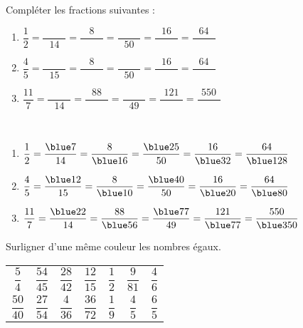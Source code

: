 \begin{colonne*exercice}
\begin{exercice} %
   Compléter les fractions suivantes : \medskip
   \begin{enumerate}
      \item $\dfrac{1}{2} =\dfrac{\qquad\;}{14} =\dfrac{8}{\qquad\;} =\dfrac{\qquad\;}{50} =\dfrac{16}{\qquad\;} =\dfrac{64}{\qquad\;}$ \\ [2mm]
      \item $\dfrac{4}{5} =\dfrac{\qquad\;}{15} =\dfrac{8}{\qquad\;} =\dfrac{\qquad\;}{50} =\dfrac{16}{\qquad\;} =\dfrac{64}{\qquad\;}$ \\ [2mm]
      \item $\dfrac{11}{7} =\dfrac{\qquad\;}{14} =\dfrac{88}{\qquad\;} =\dfrac{\qquad\;}{49} =\dfrac{121}{\qquad\;} =\dfrac{550}{\qquad\;}$ \\
   \end{enumerate}
\end{exercice}

\begin{corrige}
   \ \\ [-5mm]
   \begin{enumerate}
      \item $\dfrac{1}{2} =\dfrac{\blue 7}{14} =\dfrac{8}{\blue 16} =\dfrac{\blue 25}{50} =\dfrac{16}{\blue 32} =\dfrac{64}{\blue 128}$ \\ [2mm]
      \item $\dfrac{4}{5} =\dfrac{\blue 12}{15} =\dfrac{8}{\blue 10} =\dfrac{\blue 40}{50} =\dfrac{16}{\blue 20} =\dfrac{64}{\blue 80}$ \\ [2mm]
      \item $\dfrac{11}{7} =\dfrac{\blue 22}{14} =\dfrac{88}{\blue 56} =\dfrac{\blue 77}{49} =\dfrac{121}{\blue 77} =\dfrac{550}{\blue 350}$
   \end{enumerate}
\end{corrige}

\medskip

\begin{exercice} %
   Surligner d'une même couleur les nombres égaux. \\ [2mm]
   {
   \begin{tabular}{|*{7}{C{0.8}}|}
      \hline
      $\dfrac{5}{4}$ & $\dfrac{54}{45}$ & $\dfrac{28}{42}$ & $\dfrac{12}{15}$ & $\dfrac{1}{2}$ & $\dfrac{9}{81}$ & $\dfrac{4}{6}$ \\ [2mm]
      $\dfrac{50}{40}$ & $\dfrac{27}{54}$ & $\dfrac{4}{36}$ & $\dfrac{36}{72}$ & $\dfrac{1}{9}$ & $\dfrac{4}{5}$ & $\dfrac{6}{5}$ \\ [2mm]
      \hline
   \end{tabular}} \\ [1mm]
\end{exercice}


\end{colonne*exercice}
